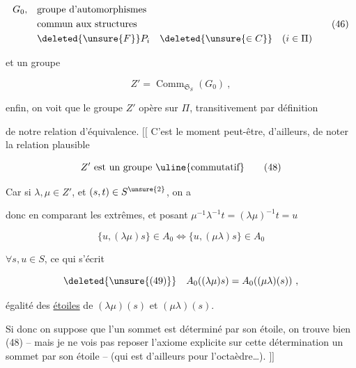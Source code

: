 
\[
\begin{aligned}
 G_0,\quad &\text{groupe d'automorphismes}\\
 &\text{commun aux structures}\\
 &\deleted{\unsure{F}}P_i\quad\deleted{\unsure{\in C}}\quad(i\in\Pi)
\end{aligned}\tag*{$(46)$}
\]

et un groupe

\[
 Z'=\operatorname{Comm}_{\mathfrak S_S}(G_0)\ ,
\tag*{$(47)$}
\]

enfin, on voit que le groupe $Z'$ opère sur $\Pi$, transitivement par définition

de notre relation d'équivalence. $[\![$ C'est le moment peut-être, d'ailleurs, de noter la relation plausible

\[
Z'\text{ est un groupe \uline{commutatif}}
\tag*{$(48)$}
\]


Car si $\lambda,\mu\in Z'$, et $(s,t)\in S^{\unsure{2}}$, on a


donc en comparant les extrêmes, et posant $\mu^{-1}\lambda^{-1}t=(\lambda\mu)^{-1}t=u$

\[
\{u,(\lambda\mu)s\}\in A_0\Longleftrightarrow\{u,(\mu\lambda)s\}\in A_0
\]

$\forall s,u\in S$, ce qui s'écrit 

\[
\deleted{\unsure{(49)}}\quad A_0((\lambda\mu)s)=A_0((\mu\lambda)(s))\ ,
\]

égalité des \uline{étoiles} de $(\lambda\mu)(s)$ et $(\mu\lambda)(s)$.


Si donc on suppose que l'un sommet est déterminé par son étoile, on trouve bien (48) -- mais je ne vois pas  reposer l'axiome explicite sur cette détermination un sommet par son étoile -- (qui est d'ailleurs  pour l'octaèdre\ldots). $]\!]$

